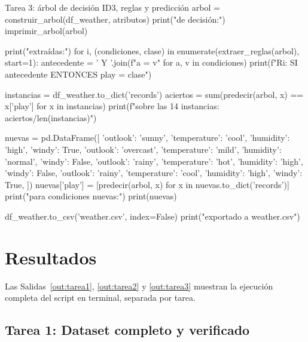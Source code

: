 \documentclass[11pt,letterpaper]{article}
\begin{document}
\begin{codigo}[label=cod:tarea3]{Tarea 3: árbol de decisión ID3, reglas y predicción}
arbol = construir_arbol(df_weather, atributos)
print(" de decisión:")
imprimir_arbol(arbol)

print("\nReglas extraídas:")
for i, (condiciones, clase) in enumerate(extraer_reglas(arbol), start=1):
    antecedente = ' Y '.join(f"{a} = {v}" for a, v in condiciones)
    print(f"R{i}: SI {antecedente} ENTONCES play = {clase}")

instancias = df_weather.to_dict('records')
aciertos = sum(predecir(arbol, x) == x['play'] for x in instancias)
print(f"\nExactitud sobre las 14 instancias: {aciertos}/{len(instancias)}")

nuevas = pd.DataFrame([
    {'outlook': 'sunny', 'temperature': 'cool', 'humidity': 'high', 'windy': True},
    {'outlook': 'overcast', 'temperature': 'mild', 'humidity': 'normal', 'windy': False},
    {'outlook': 'rainy', 'temperature': 'hot', 'humidity': 'high', 'windy': False},
    {'outlook': 'rainy', 'temperature': 'cool', 'humidity': 'high', 'windy': True},
])
nuevas['play'] = [predecir(arbol, x) for x in nuevas.to_dict('records')]
print(" para condiciones nuevas:")
print(nuevas)

df_weather.to_csv('weather.csv', index=False)
print("\nDataset exportado a weather.csv")
\end{codigo}

\section{Resultados}

Las Salidas~\ref{out:tarea1}, \ref{out:tarea2} y \ref{out:tarea3} muestran la ejecución completa del script en terminal, separada por tarea.

\subsection{Tarea 1: Dataset completo y verificado}
\end{document}
